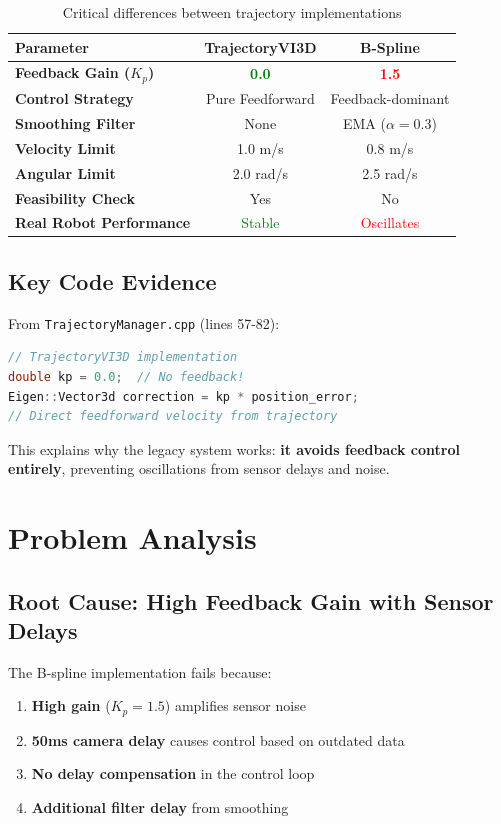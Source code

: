 \documentclass[12pt,a4paper]{article}
\begin{document}
\begin{table}[H]
\centering
\begin{tabular}{|l|c|c|}
\hline
\textbf{Parameter} & \textbf{TrajectoryVI3D} & \textbf{B-Spline} \\
\hline
\textbf{Feedback Gain ($K_p$)} & \textcolor{green}{\textbf{0.0}} & \textcolor{red}{\textbf{1.5}} \\
\textbf{Control Strategy} & Pure Feedforward & Feedback-dominant \\
\textbf{Smoothing Filter} & None & EMA ($\alpha=0.3$) \\
\textbf{Velocity Limit} & 1.0 m/s & 0.8 m/s \\
\textbf{Angular Limit} & 2.0 rad/s & 2.5 rad/s \\
\textbf{Feasibility Check} & Yes & No \\
\textbf{Real Robot Performance} & \textcolor{green}{Stable} & \textcolor{red}{Oscillates} \\
\hline
\end{tabular}
\caption{Critical differences between trajectory implementations}
\end{table}

\subsection{Key Code Evidence}

From \texttt{TrajectoryManager.cpp} (lines 57-82):
\begin{lstlisting}[language=C++]
// TrajectoryVI3D implementation
double kp = 0.0;  // No feedback!
Eigen::Vector3d correction = kp * position_error;
// Direct feedforward velocity from trajectory
\end{lstlisting}

This explains why the legacy system works: \textbf{it avoids feedback control entirely}, preventing oscillations from sensor delays and noise.

\section{Problem Analysis}

\subsection{Root Cause: High Feedback Gain with Sensor Delays}

The B-spline implementation fails because:
\begin{enumerate}
    \item \textbf{High gain} ($K_p = 1.5$) amplifies sensor noise
    \item \textbf{50ms camera delay} causes control based on outdated data
    \item \textbf{No delay compensation} in the control loop
    \item \textbf{Additional filter delay} from smoothing
\end{enumerate}
\end{document}
